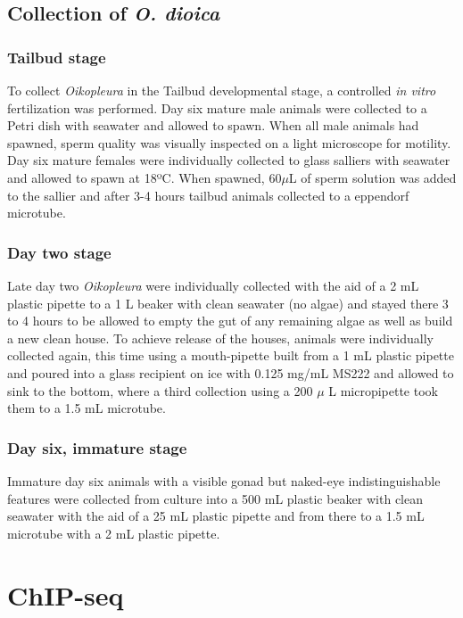 \documentclass[11pt,twoside,a4paper]{report}
\begin{document}
		\subsection{Collection of \textit{O. dioica}}
			\subsubsection{Tailbud stage}
			\label{subsubsection:TailbudCollection}
			To collect \textit{Oikopleura} in the Tailbud developmental stage, a controlled \textit{in vitro} fertilization was performed. Day six mature male animals were collected to a Petri dish with seawater and allowed to spawn. When all male animals had spawned, sperm quality was visually inspected on a light microscope for motility. Day six mature females were individually collected to glass salliers with seawater and allowed to spawn at 18ºC. When spawned, 60$\mu$L of sperm solution was added to the sallier and after 3-4 hours tailbud animals collected to a eppendorf microtube.
			
			\subsubsection{Day two stage}
			Late day two \textit{Oikopleura} were individually collected with the aid of a 2 mL plastic pipette to a 1 L beaker with clean seawater (no algae) and stayed there 3 to 4 hours to be allowed to empty the gut of any remaining algae as well as build a new clean house.
			To achieve release of the houses, animals were individually collected again, this time using a mouth-pipette built from a 1 mL plastic pipette and poured into a glass recipient on ice with 0.125 mg/mL MS222 and allowed to sink to the bottom, where a third collection using a 200 $\mu$
			L micropipette took them to a 1.5 mL microtube.
			
			\subsubsection{Day six, immature stage}
			Immature day six animals with a visible gonad but naked-eye indistinguishable features were collected from culture into a 500 mL plastic beaker with clean seawater with the aid of a 25 mL plastic pipette and from there to a 1.5 mL microtube with a 2 mL plastic pipette. 
		
	
	\section{ChIP-seq}
\end{document}
